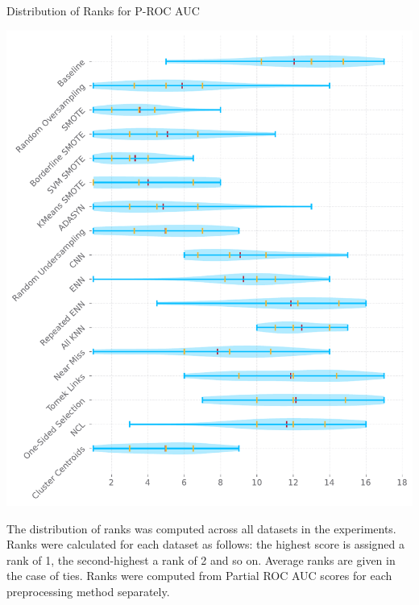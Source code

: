 \documentclass[a0paper, portrait, fontscale=0.255]{baposter}
\begin{document}
\begin{poster}
\begin{posterbox}[column=0, name=result-ranks, below=goals]{Distribution of Ranks for P-ROC AUC}
    \begin{center}
        \includegraphics[width=\linewidth]{
            ../thesis/figures/partial_roc_auc_ranks_distribution.pdf
        }
    \end{center}

    The distribution of ranks was computed across all datasets in the experiments. Ranks were
    calculated for each dataset as follows: the highest score is assigned a rank of 1, the
    second-highest a rank of 2 and so on. Average ranks are given in the case of ties. Ranks were
    computed from Partial ROC AUC scores for each preprocessing method separately.
\end{posterbox}



\end{poster}
\end{document}
